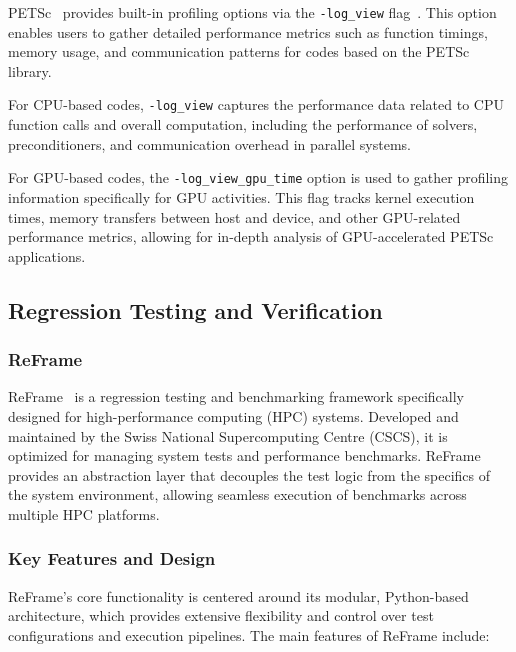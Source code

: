PETSc~\cite{balay_petsc_2024} provides built-in profiling options via the \texttt{-log\_view} flag~\cite{balay_petsctao_2024}. 
This option enables users to gather detailed performance metrics such as function timings, memory usage, and communication patterns for codes based on the PETSc library. 

For CPU-based codes, \texttt{-log\_view} captures the performance data related to CPU function calls and overall computation, including the performance of solvers, preconditioners, and communication overhead in parallel systems.

For GPU-based codes, the \texttt{-log\_view\_gpu\_time} option is used to gather profiling information specifically for GPU activities. 
This flag tracks kernel execution times, memory transfers between host and device, and other GPU-related performance metrics, allowing for in-depth analysis of GPU-accelerated PETSc applications.




\subsection{Regression Testing and Verification}
\label{sec:methodology-regression}

\subsubsection{ReFrame}
\label{sec:methodology-regression-reframe}


ReFrame~\cite{karakasis_reframe-hpcreframe_2024} is a regression testing and benchmarking framework specifically designed for high-performance computing (HPC) systems. 
Developed and maintained by the Swiss National Supercomputing Centre (CSCS), it is optimized for managing system tests and performance benchmarks. 
ReFrame provides an abstraction layer that decouples the test logic from the specifics of the system environment, allowing seamless execution of benchmarks across multiple HPC platforms.

\subsubsection{Key Features and Design}

ReFrame's core functionality is centered around its modular, Python-based architecture, which provides extensive flexibility and control over test configurations and execution pipelines. The main features of ReFrame include:

